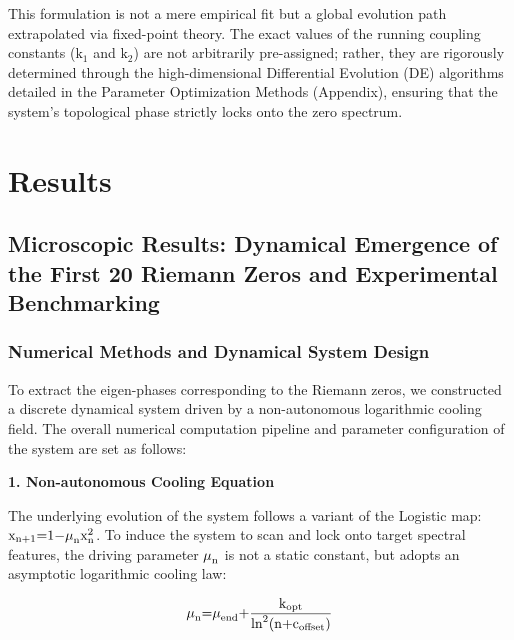 \documentclass[fractalfract,article,submit,oneauthor,pdftex]{Definitions/mdpi}
\begin{document}
This formulation is not a mere empirical fit but a global evolution path
extrapolated via fixed-point theory. The exact values of the running
coupling constants (\(\text{k}_{\text{1}}\) and \(\text{k}_{\text{2}}\))
are not arbitrarily pre-assigned; rather, they are rigorously determined
through the high-dimensional Differential Evolution (DE) algorithms
detailed in the Parameter Optimization Methods (Appendix), ensuring
that the system's topological phase strictly locks onto the zero
spectrum.

\section{Results}

\subsection{Microscopic Results: Dynamical Emergence of the First 20 Riemann Zeros and Experimental Benchmarking}

\subsubsection{Numerical Methods and Dynamical System Design}

To extract the eigen-phases corresponding to the Riemann zeros, we
constructed a discrete dynamical system driven by a non-autonomous
logarithmic cooling field. The overall numerical computation pipeline
and parameter configuration of the system are set as follows:

\textbf{1. Non-autonomous Cooling Equation}

The underlying evolution of the system follows a variant of the Logistic
map:
\(\text{x}_{\text{n}\text{+1}}\text{=1\ensuremath{-}}\text{\ensuremath{\mu}}_{\text{n}}\text{x}_{\text{n}}^{\text{2}}\).
To induce the system to scan and lock onto target spectral features, the
driving parameter \(\text{\ensuremath{\mu}}_{\text{n}}\) is not a static constant, but
adopts an asymptotic logarithmic cooling law:

\begin{equation}
\text{\ensuremath{\mu}}_{\text{n}}\text{=}\text{\ensuremath{\mu}}_{\text{end}}\text{+}\frac{\text{k}_{\text{opt}}}{\text{ln}^{\text{2}}\text{(}\text{n}\text{+}\text{c}_{\text{offset}}\text{)}}
\end{equation}
\end{document}
